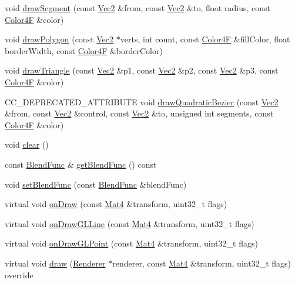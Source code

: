 \begin{DoxyCompactItemize}
\item 
void \hyperlink{classDrawNode_aa6394fffe90f57a2027289bee80d0ce5}{draw\+Segment} (const \hyperlink{classVec2}{Vec2} \&from, const \hyperlink{classVec2}{Vec2} \&to, float radius, const \hyperlink{structColor4F}{Color4F} \&color)
\item 
void \hyperlink{classDrawNode_a217a186e97728b74c06579375b173992}{draw\+Polygon} (const \hyperlink{classVec2}{Vec2} $\ast$verts, int count, const \hyperlink{structColor4F}{Color4F} \&fill\+Color, float border\+Width, const \hyperlink{structColor4F}{Color4F} \&border\+Color)
\item 
void \hyperlink{classDrawNode_ab8b8098cd512e011428e3732016fa08b}{draw\+Triangle} (const \hyperlink{classVec2}{Vec2} \&p1, const \hyperlink{classVec2}{Vec2} \&p2, const \hyperlink{classVec2}{Vec2} \&p3, const \hyperlink{structColor4F}{Color4F} \&color)
\item 
C\+C\+\_\+\+D\+E\+P\+R\+E\+C\+A\+T\+E\+D\+\_\+\+A\+T\+T\+R\+I\+B\+U\+TE void \hyperlink{classDrawNode_a78d781bde114c683d9aaf8d1a9beb3e6}{draw\+Quadratic\+Bezier} (const \hyperlink{classVec2}{Vec2} \&from, const \hyperlink{classVec2}{Vec2} \&control, const \hyperlink{classVec2}{Vec2} \&to, unsigned int segments, const \hyperlink{structColor4F}{Color4F} \&color)
\item 
void \hyperlink{classDrawNode_a9e650c39c26a8ba3c912f21388b2218d}{clear} ()
\item 
const \hyperlink{structBlendFunc}{Blend\+Func} \& \hyperlink{classDrawNode_a4852c0f114e65e96420095aaa6e63837}{get\+Blend\+Func} () const
\item 
void \hyperlink{classDrawNode_aa2fec0829a3f19c5996946fc25eccd66}{set\+Blend\+Func} (const \hyperlink{structBlendFunc}{Blend\+Func} \&blend\+Func)
\item 
virtual void \hyperlink{classDrawNode_aed389c5d434e56bd438fb6153eedd8d7}{on\+Draw} (const \hyperlink{classMat4}{Mat4} \&transform, uint32\+\_\+t flags)
\item 
virtual void \hyperlink{classDrawNode_a19ecf575260b8db580cf78921cdd40ee}{on\+Draw\+G\+L\+Line} (const \hyperlink{classMat4}{Mat4} \&transform, uint32\+\_\+t flags)
\item 
virtual void \hyperlink{classDrawNode_afd5151bb132169da091320b4a354945b}{on\+Draw\+G\+L\+Point} (const \hyperlink{classMat4}{Mat4} \&transform, uint32\+\_\+t flags)
\item 
virtual void \hyperlink{classDrawNode_a425b5c32a324be510862d2fee31328f5}{draw} (\hyperlink{classRenderer}{Renderer} $\ast$renderer, const \hyperlink{classMat4}{Mat4} \&transform, uint32\+\_\+t flags) override

\end{DoxyCompactItemize}
